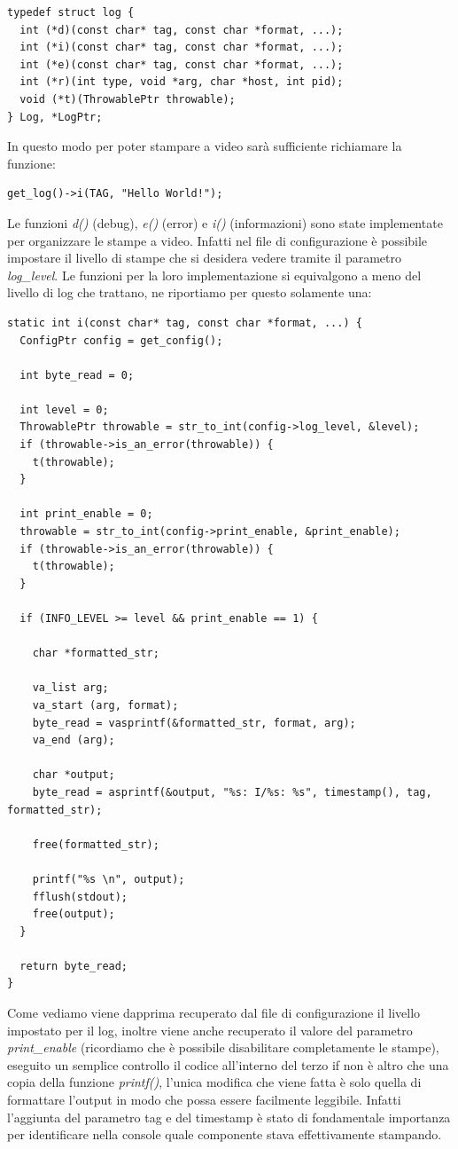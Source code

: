 \documentclass[italian]{tktltiki2}
\begin{document}
\begin{lstlisting}
typedef struct log {
  int (*d)(const char* tag, const char *format, ...);
  int (*i)(const char* tag, const char *format, ...);
  int (*e)(const char* tag, const char *format, ...);
  int (*r)(int type, void *arg, char *host, int pid);
  void (*t)(ThrowablePtr throwable);
} Log, *LogPtr;
\end{lstlisting}
In questo modo per poter stampare a video sarà sufficiente richiamare la funzione:
\begin{lstlisting}
get_log()->i(TAG, "Hello World!");
\end{lstlisting}
Le funzioni \emph{d()} (debug), \emph{e()} (error) e \emph{i()} (informazioni) sono state implementate per organizzare le stampe a video. Infatti nel file di configurazione è possibile impostare il livello di stampe che si desidera vedere tramite il parametro \emph{log\_level}. Le funzioni per la loro implementazione si equivalgono a meno del livello di log che trattano, ne riportiamo per questo solamente una:
\begin{lstlisting}
static int i(const char* tag, const char *format, ...) {
  ConfigPtr config = get_config();

  int byte_read = 0;

  int level = 0;
  ThrowablePtr throwable = str_to_int(config->log_level, &level);
  if (throwable->is_an_error(throwable)) {
    t(throwable);
  }

  int print_enable = 0;
  throwable = str_to_int(config->print_enable, &print_enable);
  if (throwable->is_an_error(throwable)) {
    t(throwable);
  }

  if (INFO_LEVEL >= level && print_enable == 1) {

    char *formatted_str;

    va_list arg;
    va_start (arg, format);
    byte_read = vasprintf(&formatted_str, format, arg);
    va_end (arg);

    char *output;
    byte_read = asprintf(&output, "%s: I/%s: %s", timestamp(), tag, formatted_str);

    free(formatted_str);

    printf("%s \n", output);
    fflush(stdout);
    free(output);
  }

  return byte_read;
}
\end{lstlisting}
Come vediamo viene dapprima recuperato dal file di configurazione il livello impostato per il log, inoltre viene anche recuperato il valore del parametro \emph{print\_enable} (ricordiamo che è possibile disabilitare completamente le stampe), eseguito un semplice controllo il codice all'interno del terzo if non è altro che una copia della funzione \emph{printf()}, l'unica modifica che viene fatta è solo quella di formattare l'output in modo che possa essere facilmente leggibile. Infatti l'aggiunta del parametro tag e del timestamp è stato di fondamentale importanza per identificare nella console quale componente stava effettivamente stampando.
\end{document}
